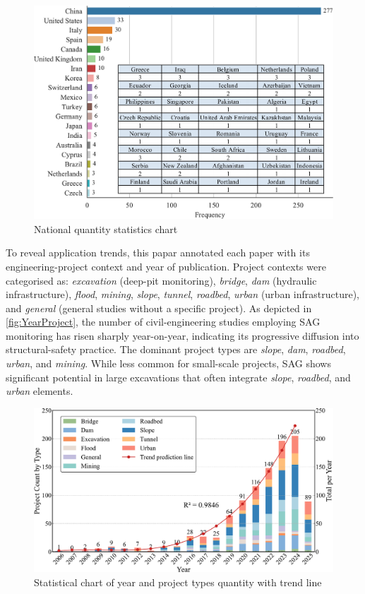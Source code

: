 \documentclass[preprint,11pt,authoryear,3p]{elsarticle}
\begin{document}
\begin{figure}[h]
    \centering
    \includegraphics[width=\textwidth]{imgs/countries.pdf}
    \caption{National quantity statistics chart}
    \label{fig:NationalStatistcs}
\end{figure}

To reveal application trends, this papar annotated each paper with its engineering-project context and year of publication. Project contexts were categorised as: \emph{excavation} (deep-pit monitoring), \emph{bridge}, \emph{dam} (hydraulic infrastructure), \emph{flood}, \emph{mining}, \emph{slope}, \emph{tunnel}, \emph{roadbed}, \emph{urban} (urban infrastructure), and \emph{general} (general studies without a specific project). As depicted in \autoref{fig:YearProject}, the number of civil-engineering studies employing SAG monitoring has risen sharply year-on-year, indicating its progressive diffusion into structural-safety practice. The dominant project types are \emph{slope}, \emph{dam}, \emph{roadbed}, \emph{urban}, and \emph{mining}. While less common for small-scale projects, SAG shows significant potential in large excavations that often integrate \emph{slope}, \emph{roadbed}, and \emph{urban} elements.

\begin{figure}[htbp]
    \centering
    \includegraphics[width=\textwidth]{./imgs/Year_Types.pdf}
    \caption{Statistical chart of year and project types quantity with trend line}
    \label{fig:YearProject}
\end{figure}
\end{document}
